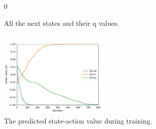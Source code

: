\documentclass{article}
\begin{document}

\begin{figure}[!h]
    \centering
     \hspace{0.1in}
     \hspace{0.1in}0
    \caption{All the next states and their q values.}
    \label{fig:c4-ql-qvalues}
\end{figure}


\begin{figure}[!h]
    \centering
    \includegraphics[width=0.50\textwidth]{figures/c4_ql_tab_action_values.pdf}
    \caption{The predicted state-action value during training.}
    \label{fig:c4-ql-tab-qvalues-progress}
\end{figure}
\end{document}
